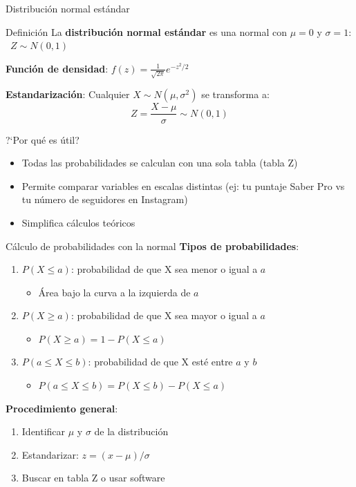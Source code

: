 \documentclass[aspectratio=169, 11pt]{beamer}
\begin{document}
\begin{frame}{Distribución normal estándar}
\begin{block}{Definición}
La \textbf{distribución normal estándar} es una normal con $\mu = 0$ y $\sigma = 1$: \ $Z \sim N(0, 1)$
\end{block}

\textbf{Funci\'on de densidad}: $f(z) = \frac{1}{\sqrt{2\pi}} e^{-z^2/2}$

\textbf{Estandarizaci\'on}: Cualquier $X \sim N(\mu, \sigma^2)$ se transforma a:
\[
Z = \frac{X - \mu}{\sigma} \sim N(0, 1)
\]

\begin{alertblock}{?`Por qu\'e es \'util?}
\begin{itemize}
\item Todas las probabilidades se calculan con una sola tabla (tabla Z)
\item Permite comparar variables en escalas distintas (ej: tu puntaje Saber Pro vs tu n\'umero de seguidores en Instagram)
\item Simplifica c\'alculos te\'oricos
\end{itemize}
\end{alertblock}
\end{frame}

\begin{frame}{Cálculo de probabilidades con la normal}
\textbf{Tipos de probabilidades}:

\begin{enumerate}
\item $P(X \leq a)$: probabilidad de que X sea menor o igual a $a$
  \begin{itemize}
  \item Área bajo la curva a la izquierda de $a$
  \end{itemize}
\item $P(X \geq a)$: probabilidad de que X sea mayor o igual a $a$
  \begin{itemize}
  \item $P(X \geq a) = 1 - P(X \leq a)$
  \end{itemize}
\item $P(a \leq X \leq b)$: probabilidad de que X esté entre $a$ y $b$
  \begin{itemize}
  \item $P(a \leq X \leq b) = P(X \leq b) - P(X \leq a)$
  \end{itemize}
\end{enumerate}

\vspace{0.5em}
\textbf{Procedimiento general}:
\begin{enumerate}
\item Identificar $\mu$ y $\sigma$ de la distribución
\item Estandarizar: $z = (x - \mu)/\sigma$
\item Buscar en tabla Z o usar software
\end{enumerate}
\end{frame}
\end{document}
